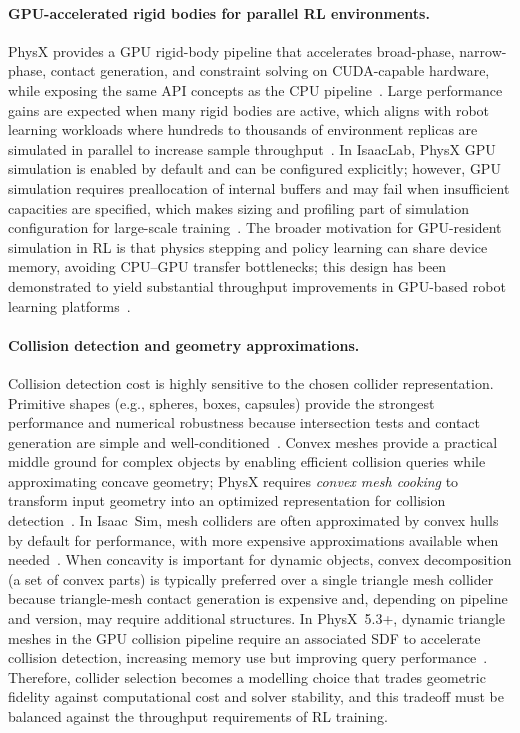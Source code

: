 \paragraph{\ac{GPU}-accelerated rigid bodies for parallel \ac{RL} environments.}
PhysX provides a \ac{GPU} rigid-body pipeline that accelerates broad-phase, narrow-phase,
contact generation, and constraint solving on CUDA-capable hardware, while exposing the
same API concepts as the \ac{CPU} pipeline~\cite{physx_gpu_rigid_bodies_510}.
Large performance gains are expected when many rigid bodies are active, which aligns with
robot learning workloads where hundreds to thousands of environment replicas are simulated
in parallel to increase sample throughput~\cite{physx_gpu_rigid_bodies_510,Makoviychuk2021IsaacGym}.
In IsaacLab, PhysX \ac{GPU} simulation is enabled by default and can be configured
explicitly; however, \ac{GPU} simulation requires preallocation of internal buffers and may
fail when insufficient capacities are specified, which makes sizing and profiling part of
simulation configuration for large-scale training~\cite{isaaclab_sim_doc}.
The broader motivation for \ac{GPU}-resident simulation in \ac{RL} is that physics stepping
and policy learning can share device memory, avoiding \ac{CPU}--\ac{GPU} transfer
bottlenecks; this design has been demonstrated to yield substantial throughput improvements
in GPU-based robot learning platforms~\cite{Makoviychuk2021IsaacGym}.

\paragraph{Collision detection and geometry approximations.}
Collision detection cost is highly sensitive to the chosen collider representation.
Primitive shapes (e.g., spheres, boxes, capsules) provide the strongest performance and
numerical robustness because intersection tests and contact generation are simple and
well-conditioned~\cite{physx_rigid_body_collision_510}.
Convex meshes provide a practical middle ground for complex objects by enabling efficient
collision queries while approximating concave geometry; PhysX requires \emph{convex mesh
cooking} to transform input geometry into an optimized representation for collision
detection~\cite{physx_geometry_541}.
In Isaac~Sim, mesh colliders are often approximated by convex hulls by default for
performance, with more expensive approximations available when needed~\cite{isaac_sim_simulation_fundamentals_510}.
When concavity is important for dynamic objects, convex decomposition (a set of convex
parts) is typically preferred over a single triangle mesh collider because triangle-mesh
contact generation is expensive and, depending on pipeline and version, may require
additional structures.
In PhysX~5.3+, dynamic triangle meshes in the \ac{GPU} collision pipeline require an
associated \ac{SDF} to accelerate collision detection, increasing memory use but improving
query performance~\cite{physx_geometry_530}.
Therefore, collider selection becomes a modelling choice that trades geometric fidelity
against computational cost and solver stability, and this tradeoff must be balanced against
the throughput requirements of \ac{RL} training.

